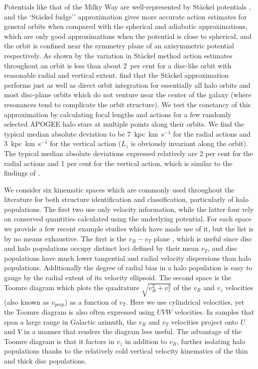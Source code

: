 Potentials like that of the Milky Way are well-represented by St\"{a}ckel potentials \parencite{dejonghe88}, and the `St\"{a}ckel fudge'' approximation gives more accurate action estimates for general orbits when compared with the spherical and adiabatic approximations, which are only good approximations when the potential is close to spherical, and the orbit is confined near the symmetry plane of an axisymmetric potential respectively. As shown by \parencite{bovy15} the variation in St\"{a}ckel method action estimates throughout an orbit is less than about 2~per cent for a disc-like orbit with reasonable radial and vertical extent. \textcite{mackereth18c} find that the St\"{a}ckel approximation performs just as well as direct orbit integration for essentially all halo orbits and most disc-plane orbits which do not venture near the center of the galaxy (where resonances tend to complicate the orbit structure). We test the constancy of this approximation by calculating focal lengths and actions for a few randomly selected APOGEE halo stars at multiple points along their orbits. We find the typical median absolute deviation to be 7~kpc~km~s$^{-1}$ for the radial actions and 3~kpc~km~s$^{-1}$ for the vertical action ($L_{z}$ is obviously invariant along the orbit). The typical median absolute deviations expressed relatively are 2 per cent for the radial actions and 1 per cent for the vertical action, which is similar to the findings of \textcite{bovy15}.

We consider six kinematic spaces which are commonly used throughout the literature for both structure identification and classification, particularly of halo populations. The first two use only velocity information, while the latter four rely on conserved quantities calculated using the underlying potential. For each space we provide a few recent example studies which have made use of it, but the list is by no means exhaustive. The first is the $v_{R}-v_{T}$ plane \parencite[e.g. ][]{belokurov18, fattahi19,lancaster19,mackereth19a,belokurov20, feuillet20}, which is useful since disc and halo populations occupy distinct loci defined by their mean $v_{T}$, and disc populations have much lower tangential and radial velocity dispersions than halo populations. Additionally the degree of radial bias in a halo population is easy to gauge by the radial extent of its velocity ellipsoid. The second space is the Toomre diagram \parencite[e.g. ][]{hawkins15,helmi18,koppelman19b,feuillet20,cordoni20} which plots the quadrature $\sqrt{v_R^2+v_z^2}$ of the $v_{R}$ and $v_{z}$ velocities (also known as $v_\mathrm{perp}$) as a function of $v_{T}$. Here we use cylindrical velocities, yet the Toomre diagram is also often expressed using $UVW$ velocities. In samples that span a large range in Galactic azimuth, the $v_R$ and $v_T$ velocities project onto $U$ and $V$ in a manner that renders the diagram less useful. The advantage of the Toomre diagram is that it factors in $v_{z}$ in addition to $v_{R}$, further isolating halo populations thanks to the relatively cold vertical velocity kinematics of the thin and thick disc populations.

